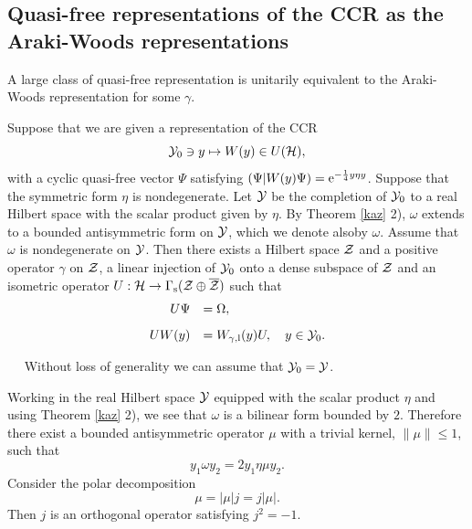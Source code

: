 \documentclass{svmult}
\newcommand{\beq}{\begin{equation}}
\newcommand{\eeq}{\end{equation}}
\def\bet{\begin{theorem}}
\def\eet{\end{theorem}}
\def\bar{\overline}
\def\l{{\rm l}}
\def\s{{\rm s}}
\def\proof{
\noindent{\bf Proof.}\ \ }
\def\cZ{{\cal Z}}
\def\cY{{\cal Y}}
\def\e{{\rm e}}
\def\d{{\rm d}}
\def\cH{{\cal H}}
\def\l{{\rm l}}
\def\e{{\rm e}}
\def\d{{\rm d}}
\def\cH{{\cal H}}
\def\s{{\rm s}}
\begin{document}

\subsection{Quasi-free representations of the CCR as the  Araki-Woods
  representations} 

A large class of quasi-free representation is unitarily
equivalent to the Araki-Woods representation for some $\gamma$.

\bet Suppose that we are given a representation of the CCR 
\beq\cY_0\ni y\mapsto W(y)\in U(\cH),\label{subs}\eeq
with a cyclic quasi-free vector $\Psi$ satisfying
$(\Psi|W(y)\Psi)=\e^{-\frac14y\eta y}$. Suppose that
the symmetric form $\eta$ is nondegenerate. Let $\cY$ be the
 completion of
$\cY_0$ to a real Hilbert space with the scalar product given by $\eta$.
By Theorem \ref{kaz} 2), $\omega$ extends to a bounded antisymmetric form on
$\cY$, which we denote alsoby $\omega$.
Assume that $\omega$ is  nondegenerate
 on $\cY$. Then there exists a Hilbert space $\cZ$ and
a positive operator $\gamma$ on $\cZ$,
a linear injection of $\cY_0$ onto a dense subspace of
 $\cZ$ and an isometric
operator $U:\cH\to\Gamma_\s(\cZ\oplus\bar\cZ)$ such that
\[\begin{array}{rl}
U\Psi&=\Omega,\\[3mm]
U W(y)&=W_{\gamma,\l}(y)U,\ \ \ y\in\cY_0.\end{array}\]
\eet

\proof
Without loss of generality we can assume that $\cY_0=\cY$.

 Working in the real Hilbert space $\cY$ equipped with the scalar
 product $\eta$ and using
 Theorem \ref{kaz} 2), we see that 
 $\omega$ is a bilinear form bounded by $2$. Therefore
there exist a 
 bounded antisymmetric
 operator $\mu$ with a trivial kernel, $\|\mu\|\leq1$,  such that
\[y_1\omega y_2=2y_1\eta\mu y_2.\]
Consider the polar decomposition \[\mu=|\mu|j=j|\mu|.\]
Then $j$ is an orthogonal operator satisfying $j^2=-1$. 
\end{document}
